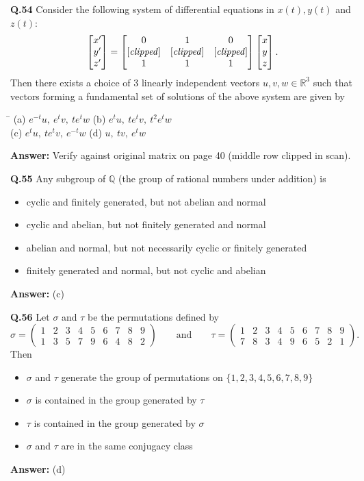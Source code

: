 \documentclass[11pt,a4paper]{article}
\newcommand{\optsfour}[4]{%
  \begin{tabbing}
    \hspace{0.48\linewidth}\=\kill
    (a) #1 \> (b) #2 \\[2pt]
    (c) #3 \> (d) #4
  \end{tabbing}%
}
\newcommand{\optslist}[4]{%
  \begin{itemize}
    \setlength{\itemsep}{2pt}\setlength{\parskip}{0pt}
    \item[(a)] #1
    \item[(b)] #2
    \item[(c)] #3
    \item[(d)] #4
  \end{itemize}%
}
\newcommand{\ans}[1]{\textbf{Answer:} #1\par\medskip}
\begin{document}
\textbf{Q.54} Consider the following system of differential equations in $x(t), y(t)$ and $z(t)$:
\[
  \begin{bmatrix} x' \\ y' \\ z' \end{bmatrix} =
  \begin{bmatrix}
    0 & 1 & 0 \\
    \text{[\textit{clipped}]} & \text{[\textit{clipped}]} & \text{[\textit{clipped}]} \\
    1 & 1 & 1
  \end{bmatrix}
  \begin{bmatrix} x \\ y \\ z \end{bmatrix}.
\]
Then there exists a choice of $3$ linearly independent vectors $u, v, w \in \mathbb{R}^3$ such that vectors forming a fundamental set of solutions of the above system are given by
\optsfour{$e^{-t}u,\ e^t v,\ te^t w$}{$e^t u,\ te^t v,\ t^2 e^t w$}{$e^t u,\ te^t v,\ e^{-t}w$}{$u,\ tv,\ e^t w$}
\ans{Verify against original matrix on page 40 (middle row clipped in scan).}

\textbf{Q.55} Any subgroup of $\mathbb{Q}$ (the group of rational numbers under addition) is
\optslist{cyclic and finitely generated, but not abelian and normal}{cyclic and abelian, but not finitely generated and normal}{abelian and normal, but not necessarily cyclic or finitely generated}{finitely generated and normal, but not cyclic and abelian}
\ans{(c)}

\textbf{Q.56} Let $\sigma$ and $\tau$ be the permutations defined by
\[
  \sigma = \begin{pmatrix} 1 & 2 & 3 & 4 & 5 & 6 & 7 & 8 & 9 \\ 1 & 3 & 5 & 7 & 9 & 6 & 4 & 8 & 2 \end{pmatrix}
  \qquad \text{and} \qquad
  \tau = \begin{pmatrix} 1 & 2 & 3 & 4 & 5 & 6 & 7 & 8 & 9 \\ 7 & 8 & 3 & 4 & 9 & 6 & 5 & 2 & 1 \end{pmatrix}.
\]
Then
\optslist{$\sigma$ and $\tau$ generate the group of permutations on $\{1,2,3,4,5,6,7,8,9\}$}{$\sigma$ is contained in the group generated by $\tau$}{$\tau$ is contained in the group generated by $\sigma$}{$\sigma$ and $\tau$ are in the same conjugacy class}
\ans{(d)}
\end{document}
